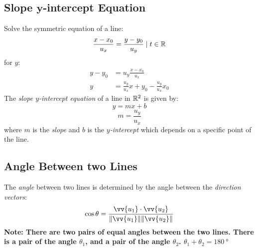 \subsection{Slope $\boldsymbol{y}$-intercept Equation}
	Solve the symmetric equation of a line:
	\[\frac{x - x_0}{u_x} = \frac{y - y_0}{u_y} \mid t \in \mathbb{R}\]
	for $y$:
	\begin{align*}
		y - y_0 &= u_y \frac{x - x_0}{u_x}\\
		y &= \frac{u_y}{u_x}x + y_0 - \frac{u_y}{u_x}x_0
	\end{align*}
	The \emph{slope $y$-intercept equation} of a line in $\mathbb{R}^2$ is given by:
	\[y = mx + b\]
	\[m = \frac{u_y}{u_x}\]
	where $m$ is the \emph{slope} and  $b$ is the \emph{$y$-intercept} which depends on a specific point of the line.
\subsection{Angle Between two Lines}
	The \emph{angle} between two lines is determined by the angle between the \emph{direction vectors}:
	\[\cos \theta = \frac{\vv{u_1} \cdot \vv{u_2}}{\norm{\vv{u_1}} \norm{\vv{u_2}}}\]
	\textbf{Note: There are two pairs of equal angles between the two lines.
	There is a pair of the angle $\theta_1$, and a pair of the angle $\theta_2$.
	$\theta_1 + \theta_2 = \SI{180}{\degree}$}
